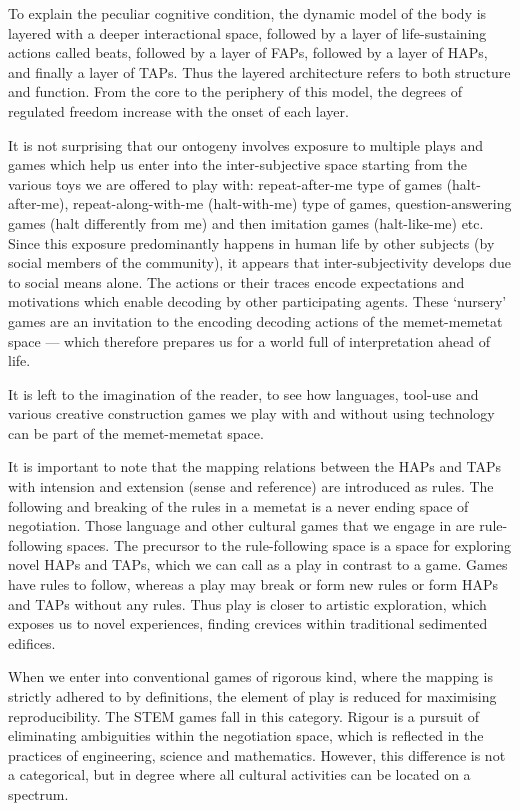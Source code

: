 To explain the peculiar cognitive condition, the dynamic model of the body is layered with a deeper interactional space, followed by a layer of life-sustaining actions called beats, followed by a layer of FAPs, followed by a layer of HAPs, and finally a layer of TAPs. Thus the layered architecture refers to both structure and function. From the core to the periphery of this model, the degrees of regulated freedom increase with the onset of each layer.

It is not surprising that our ontogeny involves exposure to multiple plays and games which help us enter into the inter-subjective space starting from the various toys we are offered to play with: repeat-after-me type of games (halt-after-me), repeat-along-with-me (halt-with-me) type of games, question-answering games (halt differently from me) and then imitation games (halt-like-me) etc. Since this exposure predominantly happens in human life by other subjects (by social members of the community), it appears that inter-subjectivity develops due to social means alone. The actions or their traces encode expectations and motivations which enable decoding by other participating agents. These `nursery' games are an invitation to the encoding decoding actions of the memet-memetat space --- which therefore prepares us for a world full of interpretation ahead of life.

It is left to the imagination of the reader, to see how languages, tool-use and various creative construction games we play with and without using technology can be part of the memet-memetat space. 

It is important to note that the mapping relations between the HAPs and TAPs with intension and extension (sense and reference) are introduced as rules. The following and breaking of the rules in a memetat is a never ending space of negotiation. Those language and other cultural games that we engage in are rule-following spaces. The precursor to the rule-following space is a space for exploring novel HAPs and TAPs, which we can call as a play in contrast to a game. Games have rules to follow, whereas a play may break or form new rules or form HAPs and TAPs without any rules. Thus play is closer to artistic exploration, which exposes us to novel experiences, finding crevices within traditional sedimented edifices.

When we enter into conventional games of rigorous kind, where the mapping is strictly adhered to by definitions, the element of play is reduced for maximising reproducibility. The STEM games fall in this category. Rigour is a pursuit of eliminating ambiguities within the negotiation space, which is reflected in the practices of engineering, science and mathematics. However, this difference is not a categorical, but in degree where all cultural activities can be located on a spectrum.

